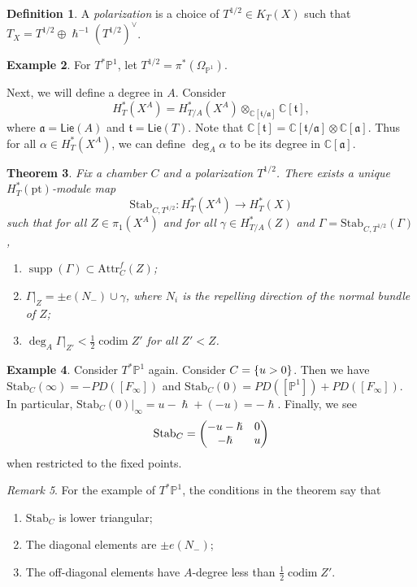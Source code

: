 \documentclass[leqno, openany]{memoir}
\newtheorem{thm}{Theorem}[section]
\theoremstyle{definition}
\newtheorem{defn}[thm]{Definition}
\newtheorem{exm}[thm]{Example}
\theoremstyle{remark}
\newtheorem{rmk}[thm]{Remark}
\theoremstyle{plain}
\theoremstyle{definition}
\theoremstyle{remark}
\newcommand{\C}{\mathbb{C}}
\renewcommand{\P}{\mathbb{P}}
\newcommand{\mf}[1]{\mathfrak{#1}}
\newcommand{\mr}[1]{\mathrm{#1}}
\newcommand{\ms}[1]{\mathsf{#1}}
\newcommand{\on}[1]{\operatorname{#1}}
\DeclareMathOperator{\supp}{supp}
\begin{document}
\begin{defn}
    A \textit{polarization} is a choice of $T^{1/2} \in K_T(X)$ such that $T_X = T^{1/2} \oplus \hslash^{-1} (T^{1/2})^{\vee}$.
\end{defn}

\begin{exm}
    For $T^* \P^1$, let $T^{1/2} = \pi^*(\Omega_{\P^1})$.
\end{exm}

Next, we will define a degree in $A$. Consider
\[ H_T^*(X^A) = H^*_{T/A}(X^A) \otimes_{\C[\mf{t}/\mf{a}]} \C[\mf{t}], \]
where $\mf{a} = \ms{Lie}(A)$ and $\mf{t} = \ms{Lie}(T)$. Note that $\C[\mf{t}] = \C[\mf{t}/\mf{a}] \otimes \C[\mf{a}]$. Thus for all $\alpha \in H_T^*(X^A)$, we can define $\deg_A \alpha$ to be its degree in $\C[\mf{a}]$.

\begin{thm}
    Fix a chamber $C$ and a polarization $T^{1/2}$. There exists a unique $H_T^*(\mr{pt})$-module map
    \[ \mr{Stab}_{C, T^{1/2}} \colon H_T^*(X^A) \to H_T^*(X) \]
    such that for all $Z \in \pi_1(X^A)$ and for all $\gamma \in H^*_{T/A}(Z)$ and $\Gamma = \mr{Stab}_{C, T^{1/2}}(\Gamma)$,
    \begin{enumerate}
        \item $\supp(\Gamma) \subset \mr{Attr}_C^f(Z)$;
        \item $\Gamma |_Z = \pm e(N_-) \cup \gamma$, where $N_i$ is the repelling direction of the normal bundle of $Z$;
        \item $\deg_A \Gamma |_{Z'} < \frac{1}{2} \on{codim} Z'$ for all $Z' < Z$.
    \end{enumerate}
\end{thm}

\begin{exm}
    Consider $T^* \P^1$ again. Consider $C = \qty{u > 0}$. Then we have $\mr{Stab}_C(\infty) = - PD([F_{\infty}])$ and $\mr{Stab}_C(0) = PD([\P^1]) + PD([F_{\infty}])$. In particular, $\mr{Stab}_C(0) |_{\infty} = u-\hslash + (-u) = -\hslash$. Finally, we see
    \[ \mr{Stab}_C = \mqty(-u-\hslash & 0 \\ -\hslash & u) \]
    when restricted to the fixed points.
\end{exm}

\begin{rmk}
    For the example of $T^* \P^1$, the conditions in the theorem say that
    \begin{enumerate}
        \item $\mr{Stab}_C$ is lower triangular;
        \item The diagonal elements are $\pm e(N_-)$;
        \item The off-diagonal elements have $A$-degree less than $\frac{1}{2} \on{codim} Z'$.
    \end{enumerate}
\end{rmk}
\end{document}
